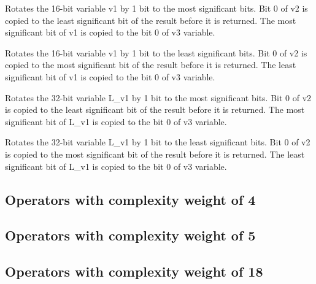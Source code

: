  

Rotates the 16-bit variable v1 by 1 bit to the most significant
bits. Bit 0 of v2 is copied to the least significant bit of the
result before it is returned. The most significant bit of v1 is
copied to the bit 0 of v3 variable.

 

Rotates the 16-bit variable v1 by 1 bit to the least significant
bits. Bit 0 of v2 is copied to the most significant bit of the
result before it is returned. The least significant bit of v1 is
copied to the bit 0 of v3 variable.


 

Rotates the 32-bit variable L\_v1 by 1 bit to the most significant
bits. Bit 0 of v2 is copied to the least significant bit of the
result before it is returned. The most significant bit of L\_v1 is
copied to the bit 0 of v3 variable.


 

Rotates the 32-bit variable L\_v1 by 1 bit to the least significant bits.
Bit 0 of v2 is copied to the most significant bit of the result before it is returned.
The least significant bit of L\_v1 is copied to the bit 0 of v3 variable.


\subsection{Operators with complexity weight of 4}


\enlargethispage*{10mm}

\subsection{Operators with complexity weight of 5}

\subsection{Operators with complexity weight of 18}



